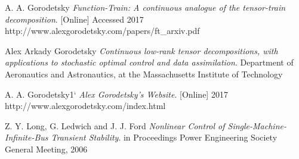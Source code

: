 \documentclass[11pt,draftd]{article}
\begin{document}
\begin{thebibliography}{9}
	A. A. Gorodetsky
	\textit{Function-Train: A continuous analogue of the tensor-train decomposition}.
	[Online] Accessed 2017
	http://www.alexgorodetsky.com/papers/ft\_arxiv.pdf
		
	Alex Arkady Gorodetsky
	\textit{Continuous low-rank tensor decompositions, with applications to stochastic optimal control and data assimilation}.
	Department of Aeronautics and Astronautics, at the Massachusetts Institute of Technology
	
	A. A. Gorodetsky1`
	\textit{Alex Gorodetsky's Website}.
	[Online] 2017
	http://www.alexgorodetsky.com/index.html
	
	Z. Y. Long, G. Ledwich and J. J. Ford
	\textit{Nonlinear Control of Single-Machine-Infinite-Bus Transient Stability}.
	in Proceedings Power Engineering Society General Meeting, 2006
	
	
\end{thebibliography}
\newpage
\end{document}
